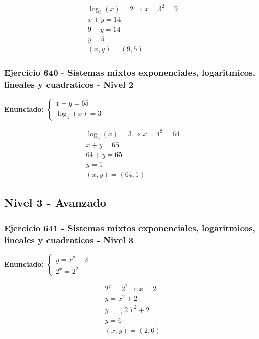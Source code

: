 \documentclass[12pt,a4paper]{article}
\begin{document}
\[
\begin{aligned}
\log_{3}\left(x\right)=2\Rightarrow x=3^{2}=9\\
x+y=14\\
9+y=14\\
y=5\\
\boxed{(x,y)=(9,5)}
\end{aligned}
\]


\subsubsection*{Ejercicio 640 - Sistemas mixtos exponenciales, logaritmicos, lineales y cuadraticos - Nivel 2}
\textbf{Enunciado:} \(\begin{cases} x+y=65\\ \log_{4}\left(x\right)=3\end{cases}\)

\[
\begin{aligned}
\log_{4}\left(x\right)=3\Rightarrow x=4^{3}=64\\
x+y=65\\
64+y=65\\
y=1\\
\boxed{(x,y)=(64,1)}
\end{aligned}
\]


\newpage

\subsection*{Nivel 3 - Avanzado}

\subsubsection*{Ejercicio 641 - Sistemas mixtos exponenciales, logaritmicos, lineales y cuadraticos - Nivel 3}
\textbf{Enunciado:} \(\begin{cases} y=x^2+2\\ 2^x=2^{2}\end{cases}\)

\[
\begin{aligned}
2^x=2^{2}\Rightarrow x=2\\
y=x^2+2\\
y=(2)^2+2\\
y=6\\
\boxed{(x,y)=(2,6)}
\end{aligned}
\]
\end{document}
